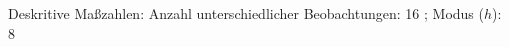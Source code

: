 				\label{tableValues:cstu29a_g1}
				\vspace*{-\baselineskip}
                    \begin{noten}
                	    \note{} Deskritive Maßzahlen:
                	    Anzahl unterschiedlicher Beobachtungen: 16%
                	    ; 
                	      Modus ($h$): 8
                     \end{noten}


